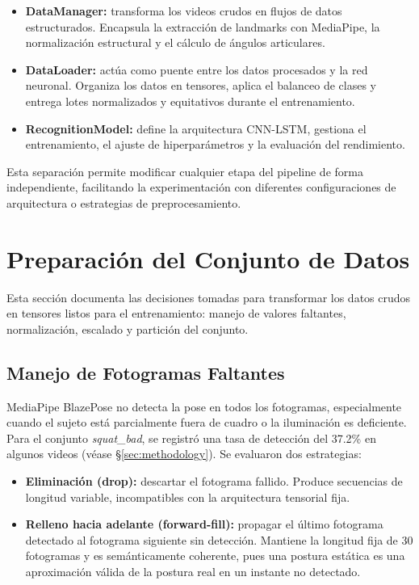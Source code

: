 \documentclass[conference]{IEEEtran}
\begin{document}
\begin{itemize}
  \item \textbf{DataManager:} transforma los videos crudos en
        flujos de datos estructurados. Encapsula la extracción
        de landmarks con MediaPipe, la normalización estructural
        y el cálculo de ángulos articulares.

  \item \textbf{DataLoader:} actúa como puente entre los datos
        procesados y la red neuronal. Organiza los datos en
        tensores, aplica el balanceo de clases y entrega lotes
        normalizados y equitativos durante el entrenamiento.

  \item \textbf{RecognitionModel:} define la arquitectura
        CNN-LSTM, gestiona el entrenamiento, el ajuste de
        hiperparámetros y la evaluación del rendimiento.
\end{itemize}

Esta separación permite modificar cualquier etapa del pipeline
de forma independiente, facilitando la experimentación con
diferentes configuraciones de arquitectura o estrategias de
preprocesamiento.

\section{Preparación del Conjunto de Datos}
\label{sec:preparation}

Esta sección documenta las decisiones tomadas para transformar
los datos crudos en tensores listos para el entrenamiento:
manejo de valores faltantes, normalización, escalado y
partición del conjunto.

\subsection{Manejo de Fotogramas Faltantes}

MediaPipe BlazePose no detecta la pose en todos los fotogramas,
especialmente cuando el sujeto está parcialmente fuera de cuadro
o la iluminación es deficiente. Para el conjunto \textit{squat\_bad},
se registró una tasa de detección del 37.2\% en algunos videos
(véase §\ref{sec:methodology}). Se evaluaron dos estrategias:

\begin{itemize}
  \item \textbf{Eliminación (drop):} descartar el fotograma
        fallido. Produce secuencias de longitud variable,
        incompatibles con la arquitectura tensorial fija.
  \item \textbf{Relleno hacia adelante (forward-fill):}
        propagar el último fotograma detectado al fotograma
        siguiente sin detección. Mantiene la longitud fija de
        30 fotogramas y es semánticamente coherente, pues
        una postura estática es una aproximación válida de la
        postura real en un instante no detectado.
\end{itemize}
\end{document}
